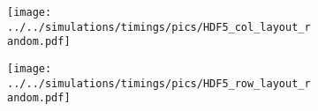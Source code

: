 \documentclass{article}
\begin{document}
\begin{figure}[bt]
    \begin{subfigure}[b]{0.49\textwidth}
        \texttt{[image: ../../simulations/timings/pics/HDF5\_col\_layout\_random.pdf]}
        \caption{}
    \end{subfigure}
    \begin{subfigure}[b]{0.49\textwidth}
        \texttt{[image: ../../simulations/timings/pics/HDF5\_row\_layout\_random.pdf]}
        \caption{}
    \end{subfigure}
\end{figure}
\end{document}
